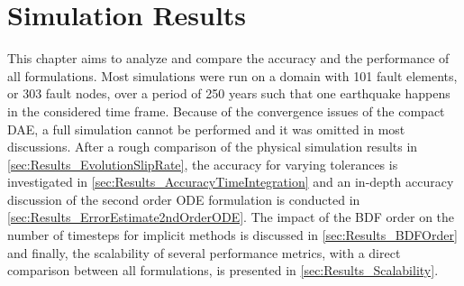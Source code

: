 \chapter{Simulation Results}

This chapter aims to analyze and compare the accuracy and the performance of all formulations. Most simulations were run on a domain with 101 fault elements, or 303 fault nodes, over a period of 250 years such that one earthquake happens in the considered time frame. Because of the convergence issues of the compact DAE, a full simulation cannot be performed and it was omitted in most discussions. After a rough comparison of the physical simulation results in \autoref{sec:Results_EvolutionSlipRate}, the accuracy for varying tolerances is investigated in \autoref{sec:Results_AccuracyTimeIntegration} and an in-depth accuracy discussion of the second order ODE formulation is conducted in \autoref{sec:Results_ErrorEstimate2ndOrderODE}. The impact of the BDF order on the number of timesteps for implicit methods is discussed in \autoref{sec:Results_BDFOrder} and finally, the scalability of several performance metrics, with a direct comparison between all formulations, is presented in \autoref{sec:Results_Scalability}.

